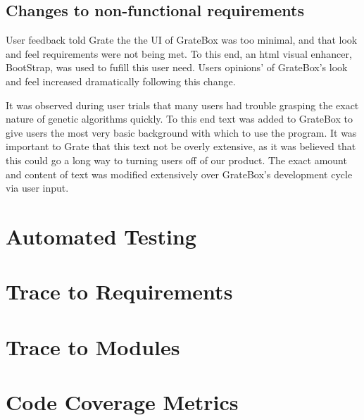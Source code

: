 \documentclass[12pt, titlepage]{article}
\begin{document}
\subsection{Changes to non-functional requirements}

User feedback told Grate the the UI of GrateBox was too minimal, and that look and feel requirements were not being met. To this end, an html visual enhancer, BootStrap, was used to fufill this user need. Users opinions' of GrateBox's look and feel increased dramatically following this change.


It was observed during user trials that many users had trouble grasping the exact nature of genetic algorithms quickly. To this end text was added to GrateBox to give users the most very basic background with which to use the program. It was important to Grate that this text not be overly extensive, as it was believed that this could go a long way to turning users off of our product. The exact amount and content of text was modified extensively over GrateBox's development cycle via user input.

\section{Automated Testing}
		
\section{Trace to Requirements}
		
\section{Trace to Modules}		

\section{Code Coverage Metrics}
\end{document}

